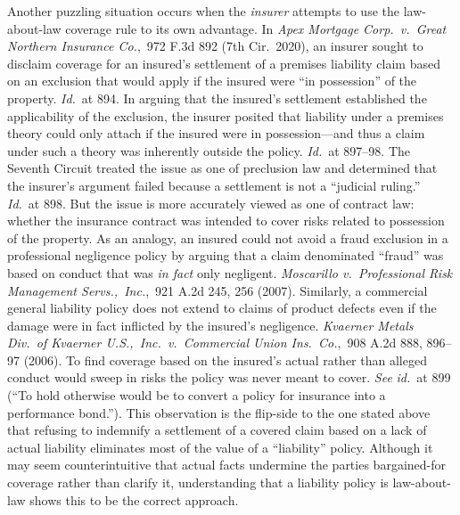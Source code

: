 \documentclass[
  12pt,
  letterpaper,
]{scrartcl}
\begin{document}
Another puzzling situation occurs when the \textit{insurer} attempts to use the
law-about-law coverage rule to its own advantage. In \textit{Apex Mortgage
Corp.~v.~Great Northern Insurance Co.},~972 F.3d 892 (7th Cir.~2020), an
insurer sought to disclaim coverage for an insured's settlement of a premises
liability claim based on an exclusion that would apply if the insured were ``in
possession'' of the property. \textit{Id.}~at 894. In arguing that the
insured's settlement established the applicability of the exclusion, the
insurer posited that liability under a premises theory could only attach if the
insured were in possession---and thus a claim under such a theory was
inherently outside the policy. \textit{Id.}~at 897--98. The Seventh Circuit
treated the issue as one of preclusion law and determined that the insurer's
argument failed because a settlement is not a ``judicial ruling.''
\textit{Id.}~at 898. But the issue is more accurately viewed as one of contract
law: whether the insurance contract was intended to cover risks related to
possession of the property. As an analogy, an insured could not avoid a fraud
exclusion in a professional negligence policy by arguing that a claim
denominated ``fraud'' was based on conduct that was \textit{in fact} only
negligent. \textit{Moscarillo v.~Professional Risk Management
Servs.,~Inc.},~921 A.2d 245, 256 (2007). Similarly, a commercial general
liability policy does not extend to claims of product defects even if the
damage were in fact inflicted by the insured's negligence. \textit{Kvaerner
Metals Div.~of Kvaerner U.S.,~Inc.~v.~Commercial Union Ins.~Co.},~908 A.2d 888,
896--97 (2006). To find coverage based on the insured's actual rather than
alleged conduct would sweep in risks the policy was never meant to cover.
\textit{See} \textit{id.}~at 899 (``To hold otherwise would be to convert a
policy for insurance into a performance bond.''). This observation is the
flip-side to the one stated above that refusing to indemnify a settlement of a
covered claim based on a lack of actual liability eliminates most of the value
of a ``liability'' policy. Although it may seem counterintuitive that actual
facts undermine the parties bargained-for coverage rather than clarify it,
understanding that a liability policy is law-about-law shows this to be the
correct approach.
\end{document}
